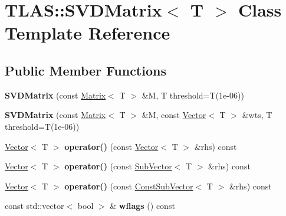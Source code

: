 \hypertarget{classTLAS_1_1SVDMatrix}{}\section{T\+L\+AS\+:\+:S\+V\+D\+Matrix$<$ T $>$ Class Template Reference}
\label{classTLAS_1_1SVDMatrix}
\subsection*{Public Member Functions}
\begin{DoxyCompactItemize}
\item 
\mbox{\label{classTLAS_1_1SVDMatrix_a5cfbd17a4707b8fdc96c01b1290379ec}} 
{\bfseries S\+V\+D\+Matrix} (const \hyperlink{classTLAS_1_1Matrix}{Matrix}$<$ T $>$ \&M, T threshold=T(1e-\/06))
\item 
\mbox{\label{classTLAS_1_1SVDMatrix_a6f2f721a3a4af04cb658aa9f76379fa3}} 
{\bfseries S\+V\+D\+Matrix} (const \hyperlink{classTLAS_1_1Matrix}{Matrix}$<$ T $>$ \&M, const \hyperlink{classTLAS_1_1Vector}{Vector}$<$ T $>$ \&wts, T threshold=T(1e-\/06))
\item 
\mbox{\label{classTLAS_1_1SVDMatrix_af5321f98ff2de8b0b0bee8c630c37de0}} 
\hyperlink{classTLAS_1_1Vector}{Vector}$<$ T $>$ {\bfseries operator()} (const \hyperlink{classTLAS_1_1Vector}{Vector}$<$ T $>$ \&rhs) const
\item 
\mbox{\label{classTLAS_1_1SVDMatrix_a55e40dcc57a617bbbca347c61716a4e6}} 
\hyperlink{classTLAS_1_1Vector}{Vector}$<$ T $>$ {\bfseries operator()} (const \hyperlink{classTLAS_1_1SubVector}{Sub\+Vector}$<$ T $>$ \&rhs) const
\item 
\mbox{\label{classTLAS_1_1SVDMatrix_ad1b49c624a426122ba25f4dcfcad2347}} 
\hyperlink{classTLAS_1_1Vector}{Vector}$<$ T $>$ {\bfseries operator()} (const \hyperlink{classTLAS_1_1ConstSubVector}{Const\+Sub\+Vector}$<$ T $>$ \&rhs) const
\item 
\mbox{\label{classTLAS_1_1SVDMatrix_a641effb9b371cb0cf786f7f1fec39371}} 
const std\+::vector$<$ bool $>$ \& {\bfseries wflags} () const

\end{DoxyCompactItemize}

